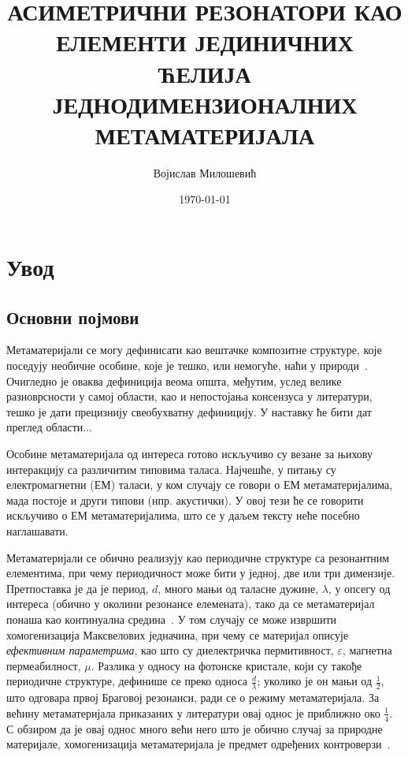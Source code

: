 \documentclass[12pt,oneside]{book}
\title{АСИМЕТРИЧНИ РЕЗОНАТОРИ КАО ЕЛЕМЕНТИ ЈЕДИНИЧНИХ ЋЕЛИЈА ЈЕДНОДИМЕНЗИОНАЛНИХ МЕТАМАТЕРИЈАЛА}
\date{\today}
\author{Војислав Милошевић}
\begin{document}
\chapter{Увод}

\tableofcontents

\section{Основни појмови}

Метаматеријали се могу дефинисати као вештачке композитне структуре, које поседују необичне особине, које је тешко, или немогуће, наћи у природи~\cite{Sham:09}. Очигледно је оваква дефиниција веома општа, међутим, услед велике разноврсности у самој области, као и непостојања консензуса у литератури, тешко је дати прецизнију свеобухватну дефиницију. У наставку ће бити дат преглед области...%

Особине метаматеријала од интереса готово искључиво су везане за њихову интеракцију са различитим типовима таласа. Најчешће, у питању су електромагнетни (ЕМ) таласи, у ком случају се говори о ЕМ метаматеријалима, мада постоје и други типови (нпр. акустички). У овој тези ће се говорити искључиво о ЕМ метаматеријалима, што се у даљем тексту неће посебно наглашавати.

Метаматеријали се обично реализују као периодичне структуре са резонантним елементима, при чему периодичност може бити у једној, две или три димензије. Претпоставка је да је период, $d$, много мањи од таласне дужине, $\lambda$, у опсегу од интереса (обично у околини резонансе елемената), тако да се метаматеријал понаша као континуална средина~\cite{landau1982}. У том случају се може извршити хомогенизација Максвелових једначина, при чему се материјал описује \emph{ефективним параметрима}, као што су диелектричка пермитивност, $\varepsilon$, магнетна пермеабилност, $\mu$. Разлика у односу на фотонске кристале, који су такође периодичне структуре, дефинише се преко односа $\frac{d}{\lambda}$; уколико је он мањи од $\frac{1}{2}$, што одговара првој Браговој резонанси, ради се о режиму метаматеријала. За већину метаматеријала приказаних у литератури овај однос је приближно око $\frac{1}{4}$. С обзиром да је овај однос много већи него што је обично случај за природне материјале, хомогенизација метаматеријала је предмет одређених контроверзи~\cite{simovski}.
\end{document}
